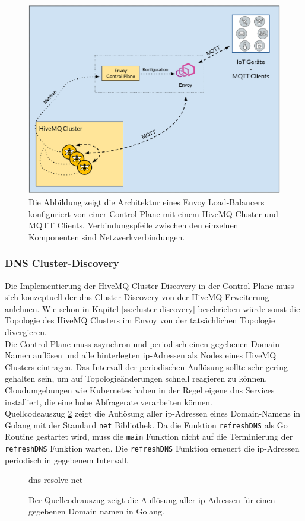 \begin{figure}[h]
    \centering
    \includegraphics[scale=0.36]{images/control-plane-architecture.png}
    \caption{Die Abbildung zeigt die Architektur eines Envoy Load-Balancers konfiguriert von einer Control-Plane mit einem HiveMQ Cluster und MQTT Clients. Verbindungspfeile zwischen den einzelnen Komponenten sind Netzwerkverbindungen.}
    \label{fig:control-plane-architecture}
\end{figure}

\subsubsection{DNS Cluster-Discovery} \label{ss:dns-discovery}
Die Implementierung der HiveMQ Cluster-Discovery in der Control-Plane muss sich konzeptuell der \ac{dns} Cluster-Discovery von der HiveMQ Erweiterung anlehnen. Wie schon in Kapitel \ref{ss:cluster-discovery} beschrieben würde sonst die Topologie des HiveMQ Clusters im Envoy von der tatsächlichen Topologie divergieren.
\\
Die Control-Plane muss asynchron und periodisch einen gegebenen Domain-Namen auflösen und alle hinterlegten \ac{ip}-Adressen als Nodes eines HiveMQ Clusters eintragen. Das Intervall der periodischen Auflösung sollte sehr gering gehalten sein, um auf Topologieänderungen schnell reagieren zu können.
Cloudumgebungen wie Kubernetes haben in der Regel eigene \ac{dns} Services installiert, die eine hohe Abfragerate verarbeiten können.
\\
Quellcodeauszug \ref{code:dns-resolve-net} zeigt die Auflösung aller \ac{ip}-Adressen eines Domain-Namens in Golang mit der Standard \verb|net| Bibliothek. Da die Funktion \verb|refreshDNS| als Go Routine gestartet wird, muss die \verb|main| Funktion nicht auf die Terminierung der \verb|refreshDNS| Funktion warten. Die \verb|refreshDNS| Funktion erneuert die \ac{ip}-Adressen periodisch in gegebenem Intervall.
\begin{figure}
    {dns-resolve-net}
    \caption{Der Quellcodeauszug zeigt die Auflösung aller \ac{ip} Adressen für einen gegebenen Domain namen in Golang.}
    \label{code:dns-resolve-net}
\end{figure}

